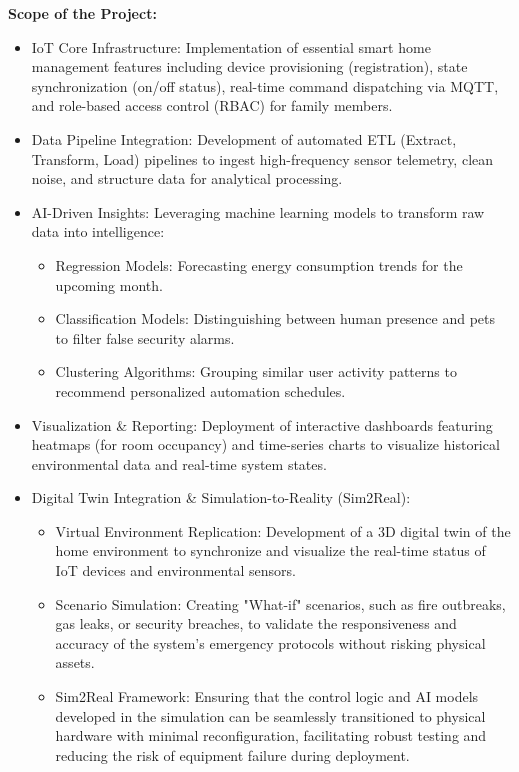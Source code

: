 \textbf{Scope of the Project:}
\begin{itemize}
    \item IoT Core Infrastructure:
    Implementation of essential smart home management features including device provisioning (registration), state synchronization (on/off status), real-time command dispatching via MQTT, and role-based access control (RBAC) for family members.
    
    \item Data Pipeline Integration: 
    Development of automated ETL (Extract, Transform, Load) pipelines to ingest high-frequency sensor telemetry, clean noise, and structure data for analytical processing.
    
    \item AI-Driven Insights: 
    Leveraging machine learning models to transform raw data into intelligence:
    \begin{itemize}
        \item Regression Models: Forecasting energy consumption trends for the upcoming month.
        \item Classification Models: Distinguishing between human presence and pets to filter false security alarms.
        \item Clustering Algorithms: Grouping similar user activity patterns to recommend personalized automation schedules.
    \end{itemize}
    
    \item Visualization \& Reporting:
    Deployment of interactive dashboards featuring heatmaps (for room occupancy) and time-series charts to visualize historical environmental data and real-time system states.

    \item Digital Twin Integration \& Simulation-to-Reality (Sim2Real):
    \begin{itemize}
        \item Virtual Environment Replication: Development of a 3D digital twin of the home environment to synchronize and visualize the real-time status of IoT devices and environmental sensors.
        \item Scenario Simulation: Creating "What-if" scenarios, such as fire outbreaks, gas leaks, or security breaches, to validate the responsiveness and accuracy of the system's emergency protocols without risking physical assets.
        \item Sim2Real Framework: Ensuring that the control logic and AI models developed in the simulation can be seamlessly transitioned to physical hardware with minimal reconfiguration, facilitating robust testing and reducing the risk of equipment failure during deployment.
    \end{itemize}


\end{itemize}
